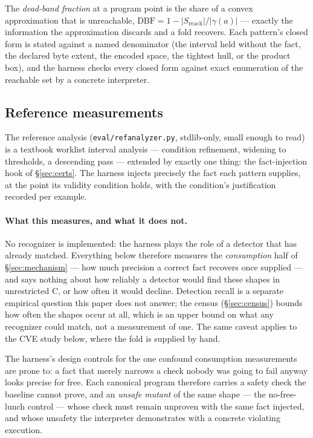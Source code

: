 \documentclass[11pt,a4paper]{article}
\begin{document}
The \emph{dead-band fraction} at a program point is the share of a convex approximation
that is unreachable, $\mathrm{DBF} = 1 - |S_{\mathrm{reach}}| / |\gamma(a)|$ --- exactly
the information the approximation discards and a fold recovers. Each pattern's closed
form is stated against a named denominator (the interval held without the fact, the
declared byte extent, the encoded space, the tightest hull, or the product box), and the
harness checks every closed form against exact enumeration of the reachable set by a
concrete interpreter.

\subsection{Reference measurements}

The reference analysis (\texttt{eval/refanalyzer.py}, stdlib-only, small enough to read)
is a textbook worklist interval analysis --- condition refinement, widening to
thresholds, a descending pass --- extended by exactly one thing: the fact-injection hook
of \S\ref{sec:certs}. The harness injects precisely the fact each pattern supplies, at
the point its validity condition holds, with the condition's justification recorded per
example.

\paragraph{What this measures, and what it does not.} No recognizer is implemented: the
harness plays the role of a detector that has already matched. Everything below therefore
measures the \emph{consumption} half of \S\ref{sec:mechanism} --- how much precision a
correct fact recovers once supplied --- and says nothing about how reliably a detector
would find these shapes in unrestricted C, or how often it would decline. Detection
recall is a separate empirical question this paper does not answer; the census
(\S\ref{sec:census}) bounds how often the shapes occur at all, which is an upper bound on
what any recognizer could match, not a measurement of one. The same caveat applies to the
CVE study below, where the fold is supplied by hand.

The harness's design controls for the one confound consumption measurements are prone
to: a fact that merely narrows a check nobody was going to fail anyway looks precise for
free. Each canonical program therefore carries a safety check the baseline cannot prove,
and an \emph{unsafe mutant} of the same shape --- the no-free-lunch control --- whose
check must remain unproven with the same fact injected, and whose unsafety the
interpreter demonstrates with a concrete violating execution.
\end{document}
